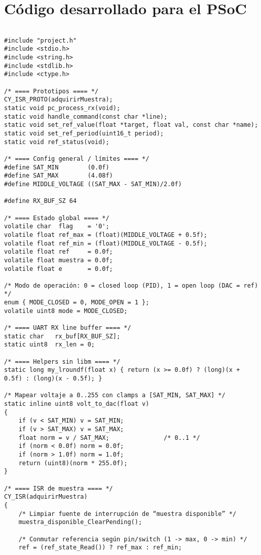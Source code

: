 \section{Código desarrollado para el PSoC }
\begin{lstlisting}[style=cstyle,
	caption={Código desarrollado para la implementación de los compensadores con el PSoC en lenguaje C.},
	label={c:psoc}
	]

#include "project.h"
#include <stdio.h>
#include <string.h>
#include <stdlib.h>
#include <ctype.h>

/* ==== Prototipos ==== */
CY_ISR_PROTO(adquirirMuestra);
static void pc_process_rx(void);
static void handle_command(const char *line);
static void set_ref_value(float *target, float val, const char *name);
static void set_ref_period(uint16_t period);
static void ref_status(void);

/* ==== Config general / límites ==== */
#define SAT_MIN        (0.0f)
#define SAT_MAX        (4.08f)
#define MIDDLE_VOLTAGE ((SAT_MAX - SAT_MIN)/2.0f)

#define RX_BUF_SZ 64

/* ==== Estado global ==== */
volatile char  flag    = '0';
volatile float ref_max = (float)(MIDDLE_VOLTAGE + 0.5f);
volatile float ref_min = (float)(MIDDLE_VOLTAGE - 0.5f);
volatile float ref     = 0.0f;
volatile float muestra = 0.0f;
volatile float e       = 0.0f;

/* Modo de operación: 0 = closed loop (PID), 1 = open loop (DAC = ref) */
enum { MODE_CLOSED = 0, MODE_OPEN = 1 };
volatile uint8 mode = MODE_CLOSED;

/* ==== UART RX line buffer ==== */
static char   rx_buf[RX_BUF_SZ];
static uint8  rx_len = 0;

/* ==== Helpers sin libm ==== */
static long my_lroundf(float x) { return (x >= 0.0f) ? (long)(x + 0.5f) : (long)(x - 0.5f); }

/* Mapear voltaje a 0..255 con clamps a [SAT_MIN, SAT_MAX] */
static inline uint8 volt_to_dac(float v)
{
	if (v < SAT_MIN) v = SAT_MIN;
	if (v > SAT_MAX) v = SAT_MAX;
	float norm = v / SAT_MAX;               /* 0..1 */
	if (norm < 0.0f) norm = 0.0f;
	if (norm > 1.0f) norm = 1.0f;
	return (uint8)(norm * 255.0f);
}

/* ==== ISR de muestra ==== */
CY_ISR(adquirirMuestra)
{
	/* Limpiar fuente de interrupción de “muestra disponible” */
	muestra_disponible_ClearPending();
	
	/* Conmutar referencia según pin/switch (1 -> max, 0 -> min) */
	ref = (ref_state_Read()) ? ref_max : ref_min;
	

\end{lstlisting}
